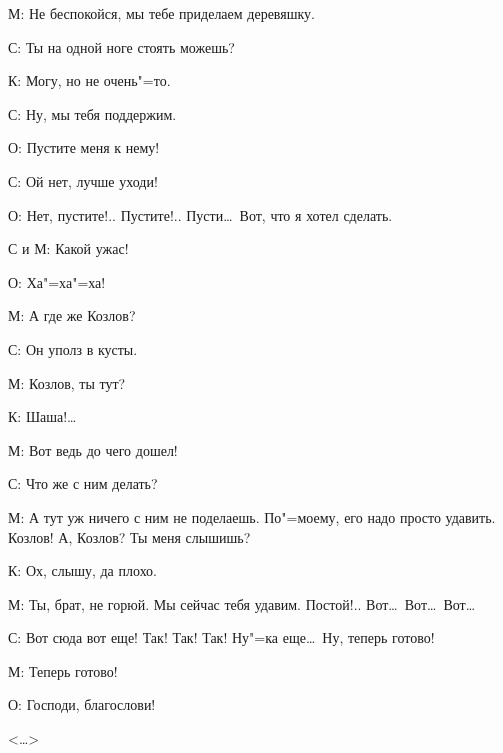 М{}: Не беспокойся, мы тебе приделаем деревяшку.

С{}: Ты на одной ноге стоять можешь?

К{}: Могу, но не очень"=то.

С{}: Ну, мы тебя поддержим.

О{}: Пустите меня к нему!

С{}: Ой нет, лучше уходи!

О{}: Нет, пустите!.. Пустите!.. Пусти\dots~Вот, что я хотел сделать.

С{} и М{}: Какой ужас!

О{}: Ха"=ха"=ха!

М{}: А где же Козлов?

С{}: Он уполз в кусты.

М{}: Козлов, ты тут?

К{}: Шаша!\dots

М{}: Вот ведь до чего дошел!

С{}: Что же с ним делать?

М{}: А тут уж ничего с ним не поделаешь. По"=моему, его надо просто удавить. Козлов! А, Козлов? Ты меня слышишь?

К{}: Ох, слышу, да плохо.

М{}: Ты, брат, не горюй. Мы сейчас тебя удавим. Постой!.. Вот\dots~Вот\dots~Вот\dots

С{}: Вот сюда вот еще! Так! Так! Так! Ну"=ка еще\dots~Ну, теперь готово!

М{}: Теперь готово!

О{}: Господи, благослови!

\begin{flushright}
    <\dots>
\end{flushright}